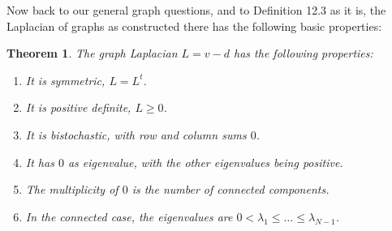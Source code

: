 \documentclass[12pt]{amsbook}
\newtheorem{theorem}{Theorem}[chapter]
\begin{document}
Now back to our general graph questions, and to Definition 12.3 as it is, the Laplacian of graphs as constructed there has the following basic properties:

\begin{theorem}
The graph Laplacian $L=v-d$ has the following properties:
\begin{enumerate}
\item It is symmetric, $L=L^t$.

\item It is positive definite, $L\geq 0$.

\item It is bistochastic, with row and column sums $0$.

\item It has $0$ as eigenvalue, with the other eigenvalues being positive.

\item The multiplicity of $0$ is the number of connected components.

\item In the connected case, the eigenvalues are $0<\lambda_1\leq\ldots\leq\lambda_{N-1}$.
\end{enumerate}
\end{theorem}
\end{document}
